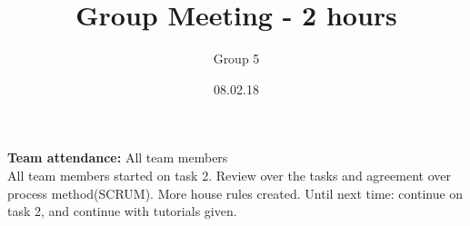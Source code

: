 \documentclass{article}
\title{Group Meeting - 2 hours}
\author{Group 5}
\date{08.02.18}
\begin{document}
	\maketitle
	\noindent
	\textbf{Team attendance:} All team members \\
	
	\noindent
	All team members started on task 2. Review over the tasks and agreement over 
	process method(SCRUM). More house rules created. Until next time: continue on
	task 2, and continue with tutorials given.
\end{document}
